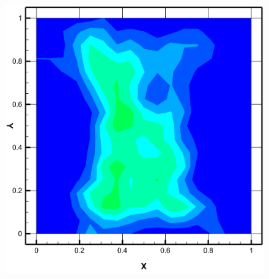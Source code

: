 \begin{figure}
\begin{minipage}[b]{0.45\textwidth}
  \end{minipage} %
  \begin{minipage}[b]{0.45\textwidth}
    \includegraphics[width=\textwidth]{figures/Ambi3.png}
  \end{minipage} %
  \hspace{3cm}
  \begin{minipage}[b]{0.2\textwidth}

\end{minipage}
\end{figure}

